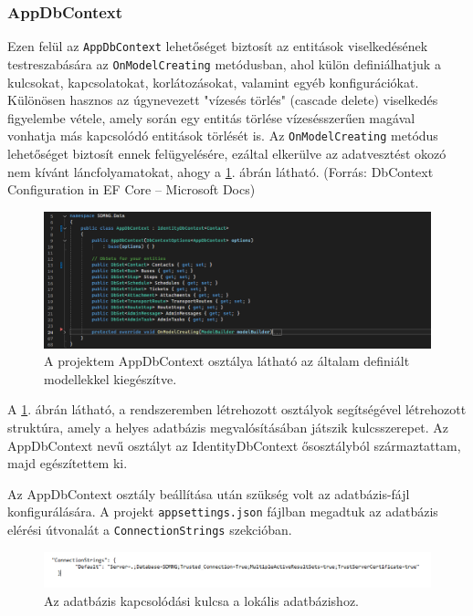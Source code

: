 \subsubsection{AppDbContext}
Ezen felül az \texttt{AppDbContext} lehetőséget biztosít az entitások viselkedésének testreszabására az \texttt{OnModelCreating} metódusban, ahol külön definiálhatjuk a kulcsokat, kapcsolatokat, korlátozásokat, valamint egyéb konfigurációkat. Különösen hasznos az úgynevezett "vízesés törlés" (cascade delete) viselkedés figyelembe vétele, amely során egy entitás törlése vízesésszerűen magával vonhatja más kapcsolódó entitások törlését is. Az \texttt{OnModelCreating} metódus lehetőséget biztosít ennek felügyelésére, ezáltal elkerülve az adatvesztést okozó nem kívánt láncfolyamatokat, ahogy a \ref{fig:appdbcontext}. ábrán látható.  (Forrás: DbContext Configuration in EF Core – Microsoft Docs)

\begin{figure}[H]
\centering
\includegraphics[width=1\textwidth]{Szakdolgozat/Mellekletek/AppDbContext.PNG}
\caption{A projektem AppDbContext osztálya látható az általam definiált modellekkel kiegészítve.}
\label{fig:appdbcontext}
\end{figure}

A \ref{fig:appdbcontext}. ábrán látható, a rendszeremben létrehozott osztályok segítségével létrehozott struktúra, amely a helyes adatbázis megvalósításában játszik kulcsszerepet. Az AppDbContext nevű osztályt az IdentityDbContext ősosztályból származtattam, majd egészítettem ki.
\vspace{\baselineskip}


Az AppDbContext osztály beállítása után szükség volt az adatbázis-fájl konfigurálására. A projekt \texttt{appsettings.json} fájlban megadtuk az adatbázis elérési útvonalát a \texttt{ConnectionStrings} szekcióban.

\begin{figure}[H]
\centering
\includegraphics[width=1\textwidth]{Szakdolgozat/Mellekletek/Connectionstring.PNG}
\caption{Az adatbázis kapcsolódási kulcsa a lokális adatbázishoz.}
\label{fig:connectionstring}
\end{figure}

